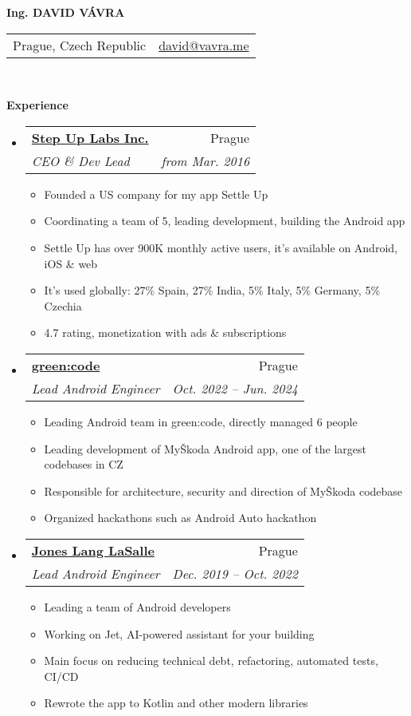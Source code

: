 \documentclass[letterpaper,11pt]{article}
\makeatletter
\newcommand{\resitem}[1]{\item #1 \vspace{-2pt}}
\newcommand{\resheading}[1]{{\large \colorbox{mygrey}{\begin{minipage}{\textwidth}{\textbf{#1 \vphantom{p\^{E}}}}\end{minipage}}}}
\newcommand{\ressubheading}[4]{
\begin{tabular*}{6.5in}{l@{\extracolsep{\fill}}r}
		\textbf{#1} & #2 \\
		\textit{#3} & \textit{#4} \\
\end{tabular*}\vspace{-6pt}}
\makeatother
\begin{document}
\newcommand{\myheader}{
\begin{center}
\textbf{\Huge Ing. DAVID VÁVRA}
\end{center} 
\begin{tabular*}{7in}{l@{\extracolsep{\fill}}r}
	Prague, Czech Republic &  \href{mailto:david@vavra.me}{david@vavra.me} \\
	\end{tabular*}
\\
\vspace{0.1in}}

\myheader



\resheading{Experience}
	\begin{itemize}
	\item 
			\ressubheading{\href{https://stepuplabs.io}{Step Up Labs Inc.}}{Prague}{CEO \& Dev Lead}{from Mar. 2016}
				{ \footnotesize
				\begin{itemize}
					\resitem{Founded a US company for my app Settle Up}
					\resitem{Coordinating a team of 5, leading development, building the Android app}
					\resitem{Settle Up has over 900K monthly active users, it's available on Android, iOS \& web}
					\resitem{It's used globally: 27\% Spain, 27\% India, 5\% Italy, 5\% Germany, 5\% Czechia}
					\resitem{4.7 rating, monetization with ads \& subscriptions}
				\end{itemize}
				}	    
	\item 
			\ressubheading{\href{https://www.greencode.cz/}{green:code}}{Prague}{Lead Android Engineer}{Oct. 2022 -- Jun. 2024}
				{ \footnotesize
				\begin{itemize}
					\resitem{Leading Android team in green:code, directly managed 6 people}
					\resitem{Leading development of MyŠkoda Android app, one of the largest codebases in CZ}
					\resitem{Responsible for architecture, security and direction of MyŠkoda codebase}
					\resitem{Organized hackathons such as Android Auto hackathon}
				\end{itemize}
				}	                
	\item 
			\ressubheading{\href{https://www.us.jll.com/}{Jones Lang LaSalle}}{Prague}{Lead Android Engineer}{Dec. 2019 -- Oct. 2022}
				{ \footnotesize
				\begin{itemize}
					\resitem{Leading a team of Android developers}
					\resitem{Working on Jet, AI-powered assistant for your building}
					\resitem{Main focus on reducing technical debt, refactoring, automated tests, CI/CD}
					\resitem{Rewrote the app to Kotlin and other modern libraries}
				\end{itemize}
				}	


\end{itemize}
\end{document}
